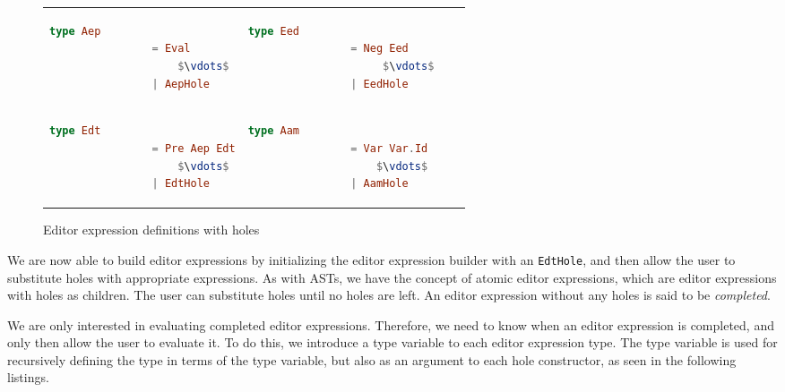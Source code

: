 \begin{figure}[H]
    \center
    \begin{tabular}{llll}

        \begin{lstlisting}[language=elm,%
                            gobble=8,%
                            mathescape,%
                            ]
             type Aep
                = Eval
                    $\vdots$
                | AepHole
        \end{lstlisting} &

        \begin{lstlisting}[language=elm,%
                            gobble=8,%
                            mathescape,%
                            ]
            type Eed
                = Neg Eed
                     $\vdots$
                | EedHole
        \end{lstlisting} \\

        \begin{lstlisting}[language=elm,%
                            gobble=8,%
                            mathescape,%
                            ]
            type Edt
                = Pre Aep Edt
                    $\vdots$
                | EdtHole
        \end{lstlisting} &

        \begin{lstlisting}[language=elm,%
                            gobble=8,%
                            mathescape,%
                            ]
            type Aam
                = Var Var.Id
                    $\vdots$
                | AamHole
        \end{lstlisting}
    \end{tabular}
    \caption{Editor expression definitions with holes}
    \label{fig:editorexpressionswithholes}
\end{figure}

We are now able to build editor expressions by initializing the editor
expression builder with an \texttt{EdtHole}, and then allow the user to
substitute holes with appropriate expressions. As with ASTs, we have the concept
of atomic editor expressions, which are editor expressions with holes as
children. The user can substitute holes until no holes are left. An editor
expression without any holes is said to be \textit{completed}.

We are only interested in evaluating completed editor expressions. Therefore, we
need to know when an editor expression is completed, and only then allow the
user to evaluate it. To do this, we introduce a type
variable to each editor expression type. The type variable is used
for recursively defining the type in terms of the type variable, but also as an
argument to each hole constructor, as seen in the following listings.

